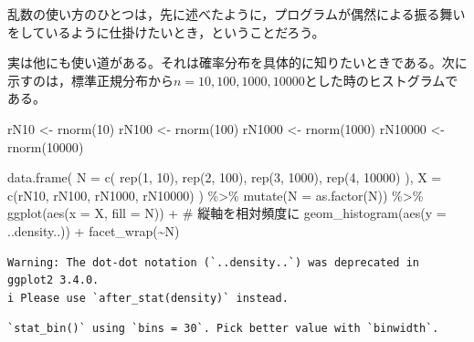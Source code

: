 \documentclass[
  a4paper,
]{ltjsbook}
\newenvironment{Shaded}{\begin{snugshade}}{\end{snugshade}}
\newcommand{\AttributeTok}[1]{\textcolor[rgb]{0.40,0.45,0.13}{#1}}
\newcommand{\CommentTok}[1]{\textcolor[rgb]{0.37,0.37,0.37}{#1}}
\newcommand{\DecValTok}[1]{\textcolor[rgb]{0.68,0.00,0.00}{#1}}
\newcommand{\FunctionTok}[1]{\textcolor[rgb]{0.28,0.35,0.67}{#1}}
\newcommand{\NormalTok}[1]{\textcolor[rgb]{0.00,0.23,0.31}{#1}}
\newcommand{\OtherTok}[1]{\textcolor[rgb]{0.00,0.23,0.31}{#1}}
\newcommand{\SpecialCharTok}[1]{\textcolor[rgb]{0.37,0.37,0.37}{#1}}
\begin{document}
乱数の使い方のひとつは，先に述べたように，プログラムが偶然による振る舞いをしているように仕掛けたいとき，ということだろう。

実は他にも使い道がある。それは確率分布を具体的に知りたいときである。次に示すのは，標準正規分布から\(n = 10,100,1000,10000\)とした時のヒストグラムである。

\begin{Shaded}
\begin{Highlighting}[]
\NormalTok{rN10 }\OtherTok{\textless{}{-}} \FunctionTok{rnorm}\NormalTok{(}\DecValTok{10}\NormalTok{)}
\NormalTok{rN100 }\OtherTok{\textless{}{-}} \FunctionTok{rnorm}\NormalTok{(}\DecValTok{100}\NormalTok{)}
\NormalTok{rN1000 }\OtherTok{\textless{}{-}} \FunctionTok{rnorm}\NormalTok{(}\DecValTok{1000}\NormalTok{)}
\NormalTok{rN10000 }\OtherTok{\textless{}{-}} \FunctionTok{rnorm}\NormalTok{(}\DecValTok{10000}\NormalTok{)}

\FunctionTok{data.frame}\NormalTok{(}
  \AttributeTok{N =} \FunctionTok{c}\NormalTok{(}
    \FunctionTok{rep}\NormalTok{(}\DecValTok{1}\NormalTok{, }\DecValTok{10}\NormalTok{), }\FunctionTok{rep}\NormalTok{(}\DecValTok{2}\NormalTok{, }\DecValTok{100}\NormalTok{),}
    \FunctionTok{rep}\NormalTok{(}\DecValTok{3}\NormalTok{, }\DecValTok{1000}\NormalTok{), }\FunctionTok{rep}\NormalTok{(}\DecValTok{4}\NormalTok{, }\DecValTok{10000}\NormalTok{)}
\NormalTok{  ),}
  \AttributeTok{X =} \FunctionTok{c}\NormalTok{(rN10, rN100, rN1000, rN10000)}
\NormalTok{) }\SpecialCharTok{\%\textgreater{}\%}
  \FunctionTok{mutate}\NormalTok{(}\AttributeTok{N =} \FunctionTok{as.factor}\NormalTok{(N)) }\SpecialCharTok{\%\textgreater{}\%}
  \FunctionTok{ggplot}\NormalTok{(}\FunctionTok{aes}\NormalTok{(}\AttributeTok{x =}\NormalTok{ X, }\AttributeTok{fill =}\NormalTok{ N)) }\SpecialCharTok{+}
  \CommentTok{\# 縦軸を相対頻度に}
  \FunctionTok{geom\_histogram}\NormalTok{(}\FunctionTok{aes}\NormalTok{(}\AttributeTok{y =}\NormalTok{ ..density..)) }\SpecialCharTok{+}
  \FunctionTok{facet\_wrap}\NormalTok{(}\SpecialCharTok{\textasciitilde{}}\NormalTok{N)}
\end{Highlighting}
\end{Shaded}

\begin{verbatim}
Warning: The dot-dot notation (`..density..`) was deprecated in ggplot2 3.4.0.
i Please use `after_stat(density)` instead.
\end{verbatim}

\begin{verbatim}
`stat_bin()` using `bins = 30`. Pick better value with `binwidth`.
\end{verbatim}
\end{document}
